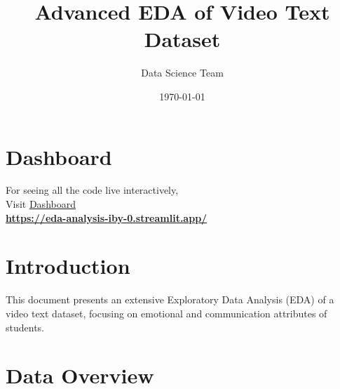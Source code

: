 \documentclass{article}
\title{\textcolor{primaryColor}{\Huge\textbf{Advanced EDA of Video Text Dataset}}}
\author{\textcolor{secondaryColor}{\Large Data Science Team}}
\date{\textcolor{secondaryColor}{\today}}
\begin{document}
\maketitle

\newpage
\section*{Dashboard}
\begin{center}
\vspace{2in}
    {\Huge  For seeing all the code live interactively, \\
    \vspace{2in}
    Visit  \href{https://eda-analysis-iby-0.streamlit.app/}{Dashboard}}\\
    
    \vspace{0.7in}
   \textbf{ \href{https://eda-analysis-iby-0.streamlit.app/}{https://eda-analysis-iby-0.streamlit.app/}}
\end{center}

\newpage
\tableofcontents

\newpage
\section{Introduction}
This document presents an extensive Exploratory Data Analysis (EDA) of a video text dataset, focusing on emotional and communication attributes of students.

\section{Data Overview}
\end{document}
